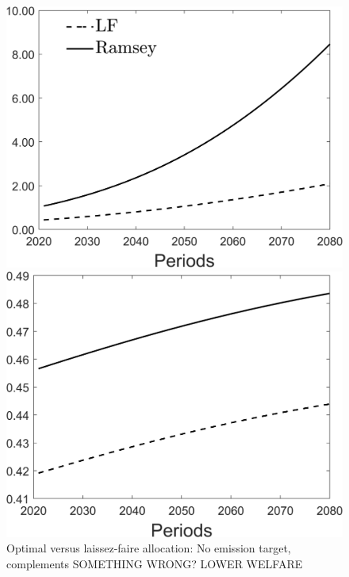 \begin{figure}[h!!]
	\centering
	\caption{Optimal versus laissez-faire allocation: No emission target, complements SOMETHING WRONG? LOWER WELFARE}\label{fig:optallo_comp}
	\begin{minipage}[]{0.32\textwidth}
		\includegraphics[width=1\textwidth]{../../codding_model/Own/figures/Rep_agent/staticRam_LF_separate_c_periods59_eppsilon0.40_zeta1.40_Ad08_Ac04_thetac0.70_thetad0.56_HetGrowth1_tauul0.181_util0_withtarget0_lgd1.png}
	\end{minipage}
	\begin{minipage}[]{0.32\textwidth}
		\includegraphics[width=1\textwidth]{../../codding_model/Own/figures/Rep_agent/staticRam_LF_separate_hh_periods59_eppsilon0.40_zeta1.40_Ad08_Ac04_thetac0.70_thetad0.56_HetGrowth1_tauul0.181_util0_withtarget0_lgd0.png}

\end{minipage}
\end{figure}
